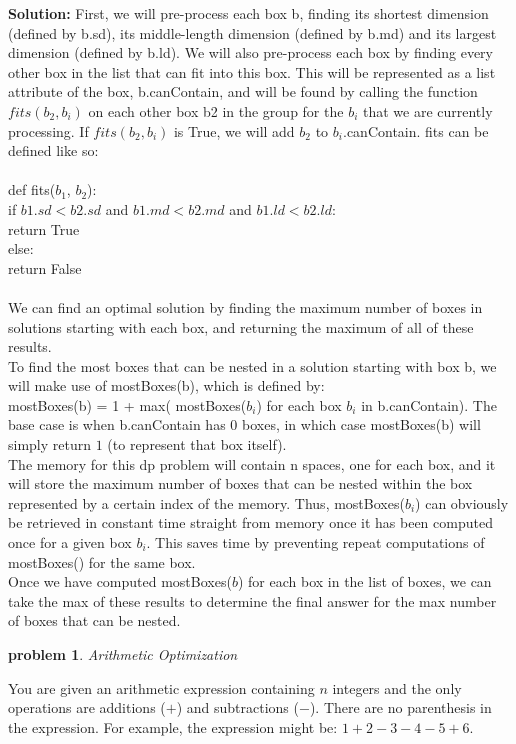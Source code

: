 \documentclass[10pt]{article}
\newcommand{\solution}[1]{\color{blue}\hfill\break\noindent\textbf{Solution:} #1\color{black}}
\newtheorem{problem}{\sc\color{cit}problem}
\begin{document}
    \solution{
    First, we will pre-process each box b, finding its shortest dimension (defined by b.sd), its middle-length dimension (defined by b.md) and its largest dimension (defined by b.ld). We will also pre-process each box by finding every other box in the list that can fit into this box. This will be represented as a list attribute of the box, b.canContain, and will be found by calling the function $fits(b_2, b_i)$ on each other box b2 in the group for the $b_i$ that we are currently processing. If $fits(b_2, b_i)$ is True, we will add $b_2$ to $b_i$.canContain. fits can be defined like so: \\ \\
    def fits($b_1$, $b_2$): \\
    \null \quad if $b1.sd < b2.sd$ and $b1.md < b2.md$ and $b1.ld < b2.ld$: \\
    \null \quad \null \quad return True \\
    \null \quad else: \\
    \null \quad \null \quad return False \\ \\
    We can find an optimal solution by finding the maximum number of boxes in solutions starting with each box, and returning the maximum of all of these results. \\
    To find the most boxes that can be nested in a solution starting with box b, we will make use of mostBoxes(b), which is defined by: \\
    mostBoxes(b) = 1 + max( mostBoxes($b_i$) for each box $b_i$ in b.canContain).
    The base case is when b.canContain has $0$ boxes, in which case mostBoxes(b) will simply return $1$ (to represent that box itself). \\
    The memory for this dp problem will contain n spaces, one for each box, and it will store the maximum number of boxes that can be nested within the box represented by a certain index of the memory. Thus, mostBoxes($b_i$) can obviously be retrieved in constant time straight from memory once it has been computed once for a given box $b_i$. This saves time by preventing repeat computations of mostBoxes() for the same box. \\
    Once we have computed mostBoxes($b$) for each box in the list of boxes, we can take the max of these results to determine the final answer for the max number of boxes that can be nested. \\
    }
    
    
\begin{problem}Arithmetic Optimization\end{problem}
You are given an arithmetic expression containing $n$ integers and the only operations are additions ($+$)
and subtractions ($-$). There are no parenthesis in the expression. For example, the expression might be: $1 + 2 - 3 - 4 - 5 + 6$.
\end{document}

